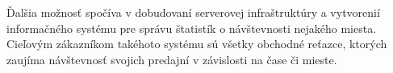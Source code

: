 Ďalšia možnosť spočíva v dobudovaní serverovej infraštruktúry a vytvorenií informačného systému pre správu štatistík o návštevnosti nejakého miesta. Cieľovým zákazníkom takéhoto systému sú všetky obchodné reťazce, ktorých zaujíma návštevnosť svojich predajní v závislosti na čase či mieste.

































